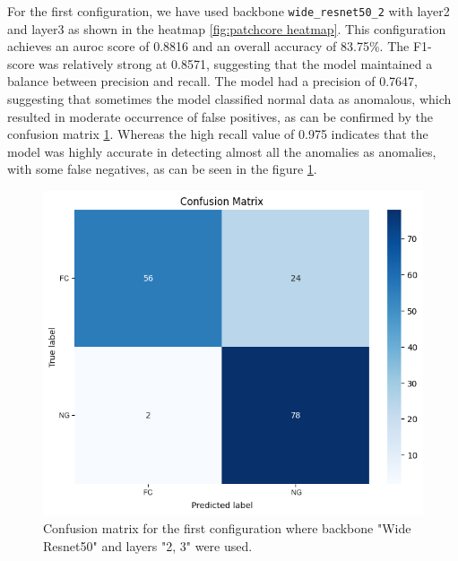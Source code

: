 For the first configuration, we have used backbone \texttt{wide\_resnet50\_2} with layer2 and layer3 as shown in the heatmap \ref{fig:patchcore heatmap}. This configuration achieves an \gls{auroc} score of 0.8816 and an overall accuracy of 83.75\%. The F1-score was relatively strong at 0.8571, suggesting that the model maintained a balance between precision and recall. The model had a precision of 0.7647, suggesting that sometimes the model classified normal data as anomalous, which resulted in moderate occurrence of false positives, as can be confirmed by the confusion matrix \ref{fig:patchcore config1 confusion matrix}. Whereas the high recall value of 0.975 indicates that the model was highly accurate in detecting almost all the anomalies as anomalies, with some false negatives, as can be seen in the figure \ref{fig:patchcore config1 confusion matrix}.

\begin{figure}[ht!]
    \centering
    \includegraphics[width=1\linewidth]{Rohit_Master_Thesis//Images/patchcore_config1_confusion_matrix.png}
    \caption{Confusion matrix for the first configuration where backbone "Wide Resnet50" and layers "2, 3" were used.}
    \label{fig:patchcore config1 confusion matrix}
\end{figure}

